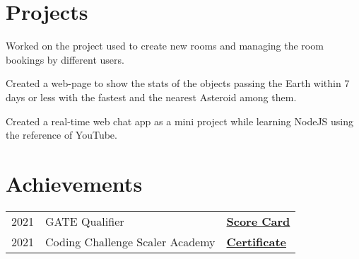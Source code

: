\documentclass[]{deedy-resume-openfont}
\begin{document}
\begin{minipage}[t]{0.66\textwidth}
\section{Projects}
Worked on the project used to create new rooms and managing the room bookings by different users.  
\sectionsep

Created a web-page to show the stats of the objects passing the Earth within 7 days or less with the fastest and the nearest Asteroid among them. 
\sectionsep

Created a real-time web chat app as a mini project while learning NodeJS using the reference of YouTube.
\sectionsep


\section{Achievements} 
\begin{tabular}{rll}
2021	     & GATE Qualifier  & \bf{\href{https://drive.google.com/file/d/15GE8USUrYsOLWMyxbJCKXGUEODwfVKVF/view?usp=sharing}{Score Card}}\\
2021     & Coding Challenge Scaler Academy &  \bf{\href{https://drive.google.com/file/d/1FvnQb3Byb9vj0uEbBudwzwYHRNe2MFp1/view}{Certificate}} \\
\end{tabular}
\sectionsep

\end{minipage} 
\end{document}
